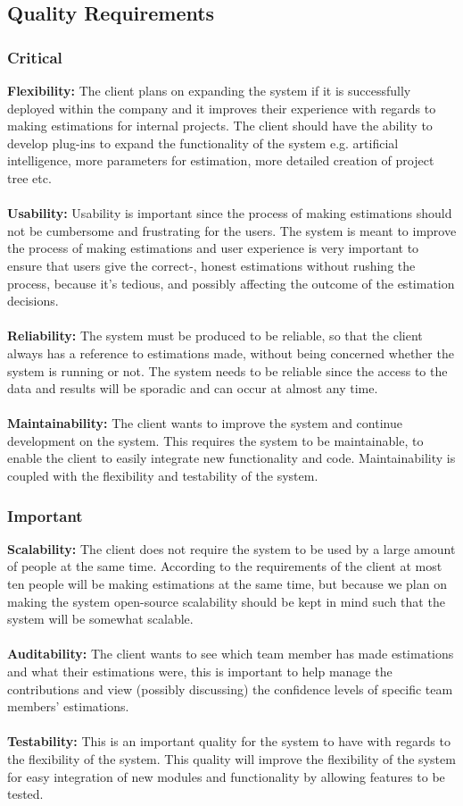 \subsection{Quality Requirements}
\subsubsection{Critical}
	{\bfseries Flexibility:}
	The client plans on expanding the system if it is successfully deployed within the company and it improves their experience with regards to making estimations for internal projects. The client should have the ability to develop plug-ins to expand the functionality of the system e.g. artificial intelligence, more parameters for estimation, more detailed creation of project tree etc.
	\\ \\
	{\bfseries Usability:}
	Usability is important since the process of making estimations should not be cumbersome and frustrating for the users. The system is meant to improve the process of making estimations and user experience is very important to ensure that users give the correct-, honest estimations without rushing the process, because it's tedious, and possibly affecting the outcome of the estimation decisions.
	\\ \\
	{\bfseries Reliability:}
	The system must be produced to be reliable, so that the client always has a reference to estimations made, without being concerned whether the system is running or not. The system needs to be reliable since the access to the data and results will be sporadic and can occur at almost any time.
	\\ \\
	{\bfseries Maintainability:}
	The client wants to improve the system and continue development on the system. This requires the system to be maintainable, to enable the client to easily integrate new functionality and code. Maintainability is coupled with the flexibility and testability of the system.
\subsubsection{Important}
	{\bfseries Scalability:}
	The client does not require the system to be used by a large amount of people at the same time. According to the requirements of the client at most ten people will be making estimations at the same time, but because we plan on making the system open-source scalability should be kept in mind such that the system will be somewhat scalable.
	\\ \\
	{\bfseries Auditability:}
	The client wants to see which team member has made estimations and what their estimations were, this is important to help manage the contributions and view (possibly discussing) the confidence levels of specific team members' estimations.
	\\ \\
	{\bfseries Testability:}
	This is an important quality for the system to have with regards to the flexibility of the system. This quality will improve the flexibility of the system for easy integration of new modules and functionality by allowing features to be tested.
